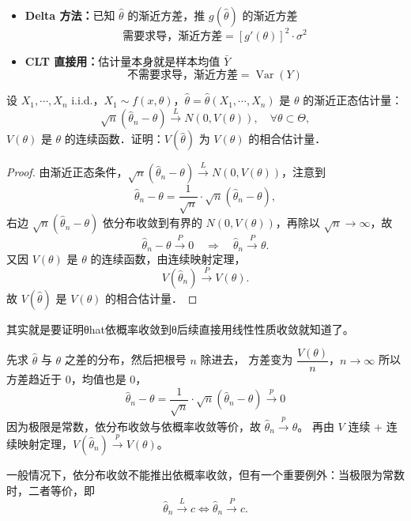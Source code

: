 \begin{dxtips}
\begin{itemize}
  \item \textbf{Delta 方法：}已知 $\hat{\theta}$ 的渐近方差，推 $g(\hat{\theta})$ 的渐近方差
        $$\text{需要求导，渐近方差} = [g'(\theta)]^2 \cdot \sigma^2$$
  \item \textbf{CLT 直接用：}估计量本身就是样本均值 $\bar{Y}$
        $$\text{不需要求导，渐近方差} = \operatorname{Var}(Y)$$
\end{itemize}
\end{dxtips}
\begin{homework}[10]
设 $X_1, \cdots, X_n$ i.i.d.，$X_1 \sim f(x, \theta)$，$\hat{\theta} = \hat{\theta}(X_1, \cdots, X_n)$ 是 $\theta$ 的渐近正态估计量：
\[
\sqrt{n}(\hat{\theta}_n - \theta) \xrightarrow{L} N(0, V(\theta)), \quad \forall \theta \subset \Theta,
\]
$V(\theta)$ 是 $\theta$ 的连续函数．证明：$V(\hat{\theta})$ 为 $V(\theta)$ 的相合估计量．
\end{homework}
\begin{proof}
由渐近正态条件，$\sqrt{n}(\hat{\theta}_n - \theta) \xrightarrow{L} N(0, V(\theta))$，注意到
\[
\hat{\theta}_n - \theta = \frac{1}{\sqrt{n}} \cdot \sqrt{n}(\hat{\theta}_n - \theta),
\]
右边 $\sqrt{n}(\hat{\theta}_n - \theta)$ 依分布收敛到有界的 $N(0, V(\theta))$，再除以 $\sqrt{n} \to \infty$，故
\[
\hat{\theta}_n - \theta \xrightarrow{P} 0 \quad \Longrightarrow \quad \hat{\theta}_n \xrightarrow{P} \theta.
\]
又因 $V(\theta)$ 是 $\theta$ 的连续函数，由连续映射定理，
\[
V(\hat{\theta}_n) \xrightarrow{P} V(\theta).
\]
故 $V(\hat{\theta})$ 是 $V(\theta)$ 的相合估计量．
\end{proof}
\begin{dxtips}
    其实就是要证明θhat依概率收敛到θ后续直接用线性性质收敛就知道了。
\end{dxtips}
\begin{dxtips}
    先求 $\hat{\theta}$ 与 $\theta$ 之差的分布，然后把根号 $n$ 除进去，
方差变为 $\dfrac{V(\theta)}{n}$，$n \to \infty$ 所以方差趋近于 $0$，均值也是 $0$，
$$\hat{\theta}_n - \theta = \frac{1}{\sqrt{n}} \cdot \sqrt{n}(\hat{\theta}_n - \theta) \xrightarrow{p} 0$$
因为极限是常数，依分布收敛与依概率收敛等价，故 $\hat{\theta}_n \xrightarrow{p} \theta$。
再由 $V$ 连续 $+$ 连续映射定理，$V(\hat{\theta}_n) \xrightarrow{p} V(\theta)$。
\end{dxtips}
\begin{note}
一般情况下，依分布收敛不能推出依概率收敛，但有一个重要例外：当极限为常数时，二者等价，即
\[
\hat{\theta}_n \xrightarrow{L} c \iff \hat{\theta}_n \xrightarrow{P} c.
\]
\end{note}
